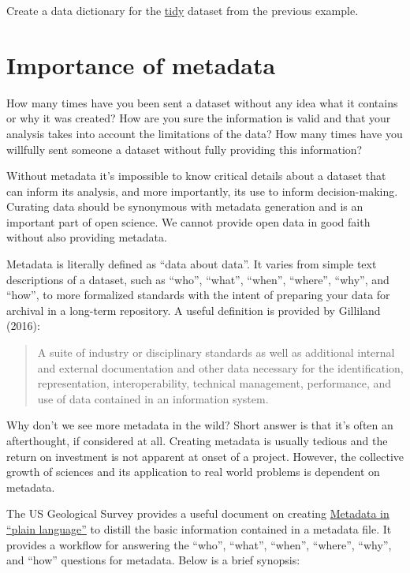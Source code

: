 \documentclass[
  letterpaper,
  DIV=11,
  numbers=noendperiod]{scrreprt}
\begin{document}
Create a data dictionary for the
\href{https://github.com/tbep-tech/cerf-os-workshop/raw/master/data/tidy.xlsx}{tidy}
dataset from the previous example.

\hypertarget{importance-of-metadata}{%
\section{Importance of metadata}\label{importance-of-metadata}}

How many times have you been sent a dataset without any idea what it
contains or why it was created? How are you sure the information is
valid and that your analysis takes into account the limitations of the
data? How many times have you willfully sent someone a dataset without
fully providing this information?

Without metadata it's impossible to know critical details about a
dataset that can inform its analysis, and more importantly, its use to
inform decision-making. Curating data should be synonymous with metadata
generation and is an important part of open science. We cannot provide
open data in good faith without also providing metadata.

Metadata is literally defined as ``data about data''. It varies from
simple text descriptions of a dataset, such as ``who'', ``what'',
``when'', ``where'', ``why'', and ``how'', to more formalized standards
with the intent of preparing your data for archival in a long-term
repository. A useful definition is provided by Gilliland (2016):

\begin{quote}
A suite of industry or disciplinary standards as well as additional
internal and external documentation and other data necessary for the
identification, representation, interoperability, technical management,
performance, and use of data contained in an information system.
\end{quote}

Why don't we see more metadata in the wild? Short answer is that it's
often an afterthought, if considered at all. Creating metadata is
usually tedious and the return on investment is not apparent at onset of
a project. However, the collective growth of sciences and its
application to real world problems is dependent on metadata.

The US Geological Survey provides a useful document on creating
\href{https://prd-wret.s3.us-west-2.amazonaws.com/assets/palladium/production/atoms/files/Metadata\%20in\%20Plain\%20Language_508compliant.pdf}{Metadata
in ``plain language''} to distill the basic information contained in a
metadata file. It provides a workflow for answering the ``who'',
``what'', ``when'', ``where'', ``why'', and ``how'' questions for
metadata. Below is a brief synopsis:
\end{document}
